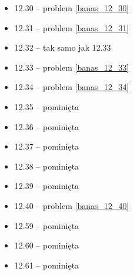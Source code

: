 \begin{multicols}{3}
\begin{itemize}
    \item 12.30 -- problem \ref{banas_12_30}
    \item 12.31 -- problem \ref{banas_12_31}
    \item 12.32 -- tak samo jak 12.33
    \item 12.33 -- problem \ref{banas_12_33}
    \item 12.34 -- problem \ref{banas_12_34}
    \item 12.35 -- pominięta
    \item 12.36 -- pominięta
    \item 12.37 -- pominięta
    \item 12.38 -- pominięta
    \item 12.39 -- pominięta
    \item 12.40 -- problem \ref{banas_12_40}
    \item 12.59 -- pominięta
    \item 12.60 -- pominięta
    \item 12.61 -- pominięta

\end{itemize}
\end{multicols}
